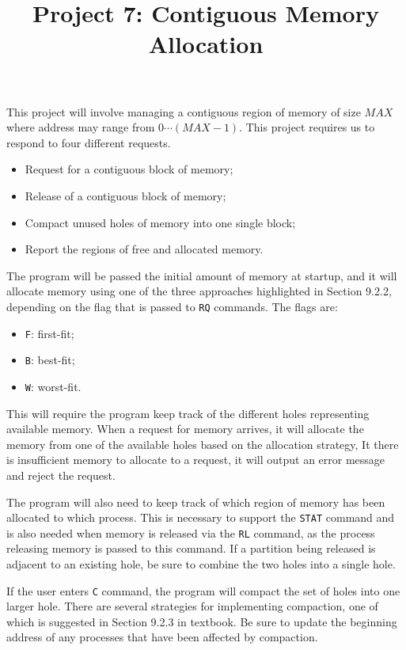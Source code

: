 \documentclass[UTF8,10pt,a4paper]{article}
\title{Project 7: Contiguous Memory Allocation}
\date{}
\theoremstyle{Problem}
\theoremstyle{Solution}
\begin{document}
\maketitle
\thispagestyle{FirstPageStyle}

This project will involve managing a contiguous region of memory of size $MAX$ where address may range from $0 \cdots (MAX - 1)$. This project requires us to respond to four different requests.
\begin{itemize}
  \item Request for a contiguous block of memory;
  \item Release of a contiguous block of memory;
  \item Compact unused holes of memory into one single block;
  \item Report the regions of free and allocated memory.
\end{itemize}

The program will be passed the initial amount of memory at startup, and it will allocate memory using one of the three approaches highlighted in Section 9.2.2, depending on the flag that is passed to \texttt{RQ} commands. The flags are:
\begin{itemize}
  \item \texttt{F}: first-fit;
  \item \texttt{B}: best-fit;
  \item \texttt{W}: worst-fit.
\end{itemize}

This will require the program keep track of the different holes representing available memory. When a request for memory arrives, it will allocate the memory from one of the available holes based on the allocation strategy, It there is insufficient memory to allocate to a request, it will output an error message and reject the request.

The program will also need to keep track of which region of memory has been allocated to which process. This is necessary to support the \texttt{STAT} command and is also needed when memory is released via the \texttt{RL} command, as the process releasing memory is passed to this command. If a partition being released is adjacent to an existing hole, be sure to combine the two holes into a single hole.

If the user enters \texttt{C} command, the program will compact the set of holes into one larger hole. There are several strategies for implementing compaction, one of which is suggested in Section 9.2.3 in textbook. Be sure to update the beginning address of any processes that have been affected by compaction.
\end{document}
